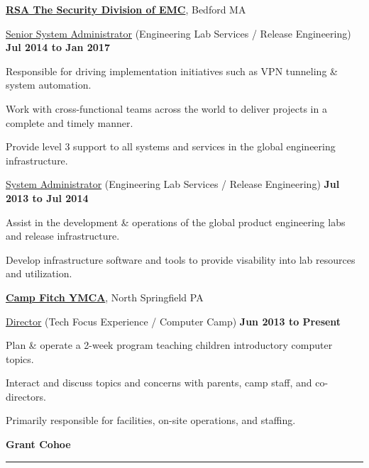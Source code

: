 \documentclass[10pt]{article}
\renewcommand\textit[1]{\underline{#1}}
\newcommand{\makeheading}[2][]%
        {\hspace*{-\marginparsep minus \marginparwidth}%
        \begin{minipage}[t]{\textwidth+\marginparwidth+\marginparsep}%
        	{\LARGE \bfseries #2 \hfill #1}\\[-0.15\baselineskip]%
                \rule{\columnwidth}{1pt}%
		\halfblankline
        \end{minipage}}
\newcommand{\halfblankline}{\quad\vspace{-0.5\baselineskip}\pagebreak[3]}
\begin{document}
\href{https://www.rsa.com/}{\textbf{RSA The Security Division of EMC}},
Bedford MA
\begin{outerlist}
   	\item[] \textit{Senior System Administrator} (Engineering Lab Services / Release Engineering)
        \hfill \textbf{Jul 2014 to Jan 2017}
        \begin{innerlist}
		\item Responsible for driving implementation initiatives such as VPN tunneling \& system automation. 
		\item Work with cross-functional teams across the world to deliver projects in a complete and timely manner. 		
		\item Provide level 3 support to all systems and services in the global engineering infrastructure.
        \end{innerlist}

    	\item[] \textit{System Administrator} (Engineering Lab Services / Release Engineering)
        \hfill \textbf{Jul 2013 to Jul 2014}
        \begin{innerlist}
               \item Assist in the development \& operations of the global product engineering labs and release infrastructure.
               \item Develop infrastructure software and tools to provide visability into lab resources and utilization.
        \end{innerlist}
\end{outerlist}
\halfblankline

\href{https://www.campcomputer.com/}{\textbf{Camp Fitch YMCA}},
North Springfield PA
\begin{outerlist}
	\item[] \textit{Director} (Tech Focus Experience / Computer Camp)
	\hfill \textbf{Jun 2013 to Present}
	\begin{innerlist}
		\item Plan \& operate a 2-week program teaching children introductory computer topics.
		\item Interact and discuss topics and concerns with parents, camp staff, and co-directors. 
		\item Primarily responsible for facilities, on-site operations, and staffing.
	\end{innerlist}
\end{outerlist}


\pagebreak
\makeheading{Grant Cohoe}
\end{document}
